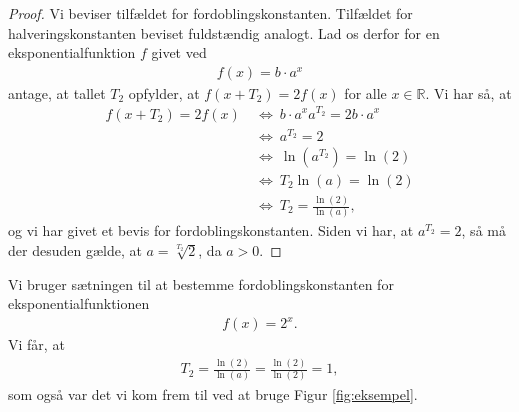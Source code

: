 \begin{proof}
Vi beviser tilfældet for fordoblingskonstanten. Tilfældet for halveringskonstanten beviset fuldstændig analogt. Lad os derfor for en eksponentialfunktion $f$ givet ved
\begin{align*}
f(x) = b\cdot a^x
\end{align*}
antage, at tallet $T_2$ opfylder, at $f(x+T_2) = 2f(x)$ for alle $x\in \mathbb{R}$. Vi har så, at 
\begin{align*}
f(x+T_2) = 2f(x) \ &\Leftrightarrow \ b\cdot a^{x}a^{T_2}=2b\cdot a^x\\
&\Leftrightarrow\ a^{T_2} = 2\\
&\Leftrightarrow\ \ln(a^{T_2}) = \ln(2)\\
&\Leftrightarrow\ T_2\ln(a) = \ln(2)\\
&\Leftrightarrow\ T_2 = \frac{\ln(2)}{\ln(a)},
\end{align*}
og vi har givet et bevis for fordoblingskonstanten. Siden vi har, at $a^{T_2} = 2$, så må der desuden gælde, at $a=\sqrt[T_2]{2}$, da $a>0$. 
\end{proof}

\begin{exa}
	Vi bruger sætningen til at bestemme fordoblingskonstanten for eksponentialfunktionen
	\begin{align*}
		f(x) = 2^x.
	\end{align*}
	Vi får, at 
	\begin{align*}
		T_2 = \frac{\ln(2)}{\ln(a)} = \frac{\ln(2)}{\ln(2)} = 1,
	\end{align*}
	som også var det vi kom frem til ved at bruge Figur \ref{fig:eksempel}.
\end{exa}

\newpage
